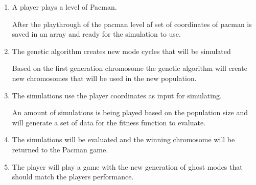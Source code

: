 \begin{enumerate}
\item A player plays a level of Pacman.

After the playthrough of the pacman level af set of coordinates of pacman is saved in an array and ready for the simulation to use.

\item The genetic algorithm creates new mode cycles that will be simulated

Based on the first generation chromosome the genetic algorithm will create new chromosomes that will be used in the new population.

\item The simulations use the player coordinates as input for simulating.

An amount of simulations is being played based on the population size and will generate a set of data for the fitness function to evaluate.

\item The simulations will be evaluated and the winning chromosome will be returned to the Pacman game.

\item The player will play a game with the new generation of ghost modes that should match the players performance. 

\end{enumerate}

